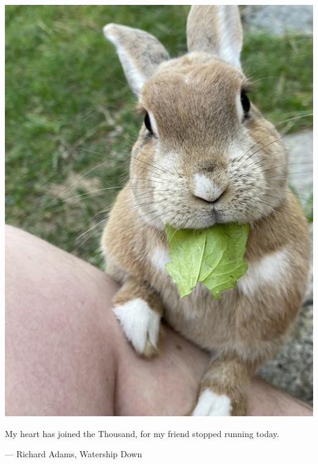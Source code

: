 
\clearforchapter
\thispagestyle{empty}

\begin{center}

  \includegraphics[width=1.25\textwidth,angle=-90,origin=c]{bosco}

  \vspace*{25pt}
  \let\oldepigraphwidth\epigraphwidth
  \setlength{\epigraphwidth}{7.5cm}
  \epigraph{
    \normalsize
    My heart has joined the Thousand, for my friend stopped running today.
  }%
  {\textup{--- Richard Adams, Watership Down}}
  \let\epigraphwidth\oldepigraphwidth
\end{center}

\cleardoublepage